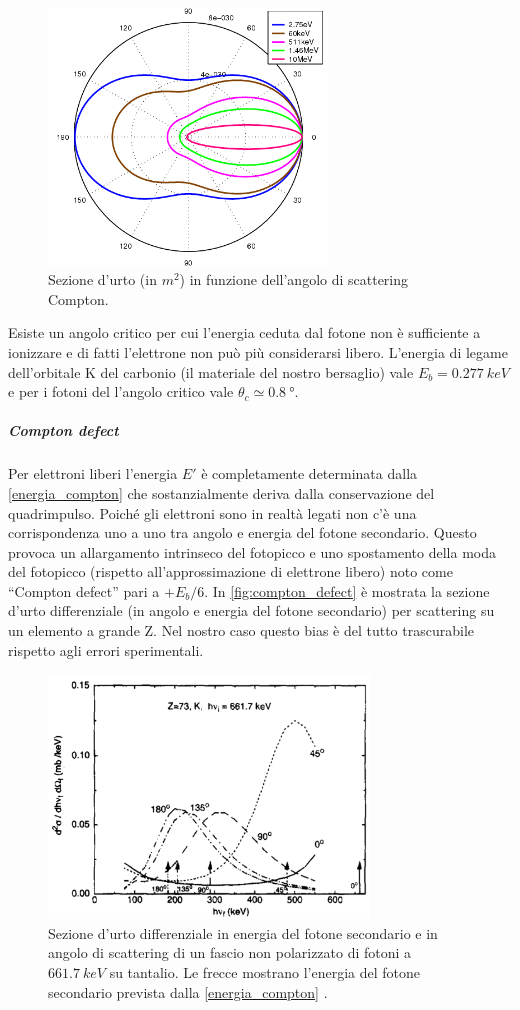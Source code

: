   \begin{figure}[h]
 	\centering
 	\includegraphics[width=20em]{klein-nishina}
 	\caption{\label{fig:klein-nishina}Sezione d'urto (in $\si{m^2}$) in funzione dell'angolo di scattering Compton.}
 \end{figure}

 Esiste un angolo critico per cui l'energia ceduta dal fotone non è sufficiente a ionizzare e di fatti l'elettrone non può più considerarsi libero. L'energia di legame dell'orbitale K del carbonio (il materiale del nostro bersaglio) vale $E_b = \SI{0.277}{keV}$ e per i fotoni del \co\; l'angolo critico vale $\theta_c \simeq \SI{0.8}{\degree}$.
 
 \subparagraph{Compton defect} \cite{7,8}
 Per elettroni liberi l'energia $E'$ è completamente determinata dalla \autoref{energia_compton} che sostanzialmente deriva dalla conservazione del quadrimpulso. Poiché gli elettroni sono in realtà legati non c'è una corrispondenza uno a uno tra angolo e energia del fotone secondario. Questo provoca un allargamento intrinseco del fotopicco e uno spostamento della moda del fotopicco (rispetto all'approssimazione di elettrone libero) noto come ``Compton defect'' pari a $+E_b/6$. In \autoref{fig:compton_defect} è mostrata la sezione d'urto differenziale (in angolo e energia del fotone secondario) per scattering su un elemento a grande Z. Nel nostro caso questo bias è del tutto trascurabile rispetto agli errori sperimentali.
 
 \begin{figure}[h]
	\centering
	\includegraphics[width=23em]{compton_defect}
	\caption{\label{fig:compton_defect}Sezione d'urto differenziale in energia del fotone secondario e in angolo di scattering di un fascio non polarizzato di fotoni a $\SI{661.7}{keV}$ su tantalio. Le frecce mostrano l'energia del fotone secondario prevista dalla \autoref{energia_compton} \cite{8}.}
\end{figure}

